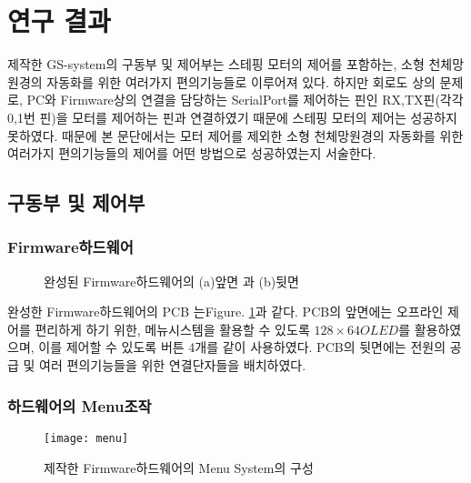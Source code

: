 \section{연구 결과}
 제작한 GS-system의 구동부 및 제어부는 스테핑 모터의 제어를 포함하는, 소형 천체망원경의 자동화를 위한 여러가지 편의기능들로 이루어져 있다. 하지만 회로도 상의 문제로, PC와 Firmware상의 연결을 담당하는 SerialPort를 제어하는 핀인 RX,TX핀(각각 0,1번 핀)을 모터를 제어하는 핀과 연결하였기 때문에 스테핑 모터의 제어는 성공하지 못하였다. 때문에 본 문단에서는 모터 제어를 제외한 소형 천체망원경의 자동화를 위한 여러가지 편의기능들의 제어를 어떤 방법으로 성공하였는지 서술한다.

\subsection{구동부 및 제어부}

\subsubsection{Firmware하드웨어}

	\begin{figure}[ht]
	\begin{center}
	\end{center}
	\caption{완성된 Firmware하드웨어의 (a)앞면 과 (b)뒷면}
	\label{pcb}
	\end{figure}
	
완성한 Firmware하드웨어의 PCB 는\textrm{Figure}. \ref{pcb}과 같다. PCB의 앞면에는 오프라인 제어를 편리하게 하기 위한, 메뉴시스템을 활용할 수 있도록 $128 \times 64 OLED$를 활용하였으며, 이를 제어할 수 있도록 버튼 4개를 같이 사용하였다. PCB의 뒷면에는 전원의 공급 및 여러 편의기능들을 위한 연결단자들을 배치하였다.
 
	
	
\subsubsection{하드웨어의 Menu조작}
 
  \begin{figure}[h]
 	\begin{center}
 		\texttt{[image: menu]}
 	\end{center}
 	\caption{제작한 Firmware하드웨어의 Menu System의 구성}
 	\label{menu}
 \end{figure}
 

